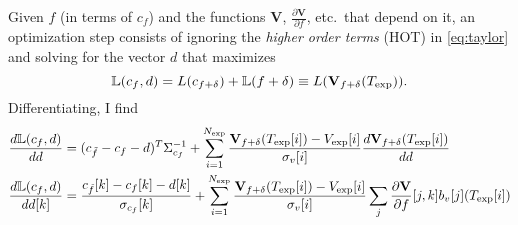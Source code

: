 \documentclass[]{article}
\newcommand{\fnom}{\tilde f}
\newcommand{\partiald}[2]{\frac{\partial #1}{\partial #2}}
\newcommand\Vt{\mathbf{V}}
\newcommand\vexp{V_{\rm{exp}}}
\newcommand\texp{T_{\rm{exp}}}
\newcommand\cf{c_f}
\newcommand\vbasis{b_v}
\newcommand\DVDf{\partiald{\Vt}{f}}
\newcommand\Lbb{\mathbb{L}}
\begin{document}
Given $f$ (in terms of $\cf$) and the functions $\Vt$, $\DVDf$, etc.\
that depend on it, an optimization step consists of ignoring the
\emph{higher order terms} (HOT) in \eqref{eq:taylor} and solving for
the vector $d$ that maximizes
\begin{equation}
  \label{eq:L}
  \Lbb(\cf,d) = L(c_{f+\delta}) +
  \Lbb(f+\delta) \equiv L(\Vt_{f+\delta}(\texp)).
\end{equation}
Differentiating, I find
\begin{align*}
  \frac{d \Lbb(\cf,d)}{d d} &= (c_{\fnom} - \cf - d)^T
  \Sigma^{-1}_{\cf} + \sum_{i=1}^{N_{\rm exp}}
  \frac{\Vt_{f+\delta}(\texp[i]) - \vexp[i] }{\sigma_v[i]}
  \frac{d \Vt_{f+\delta}(\texp[i])}{d d} \\
  \frac{d \Lbb(\cf,d)}{d d[k]} &= 
  \frac{c_{\fnom}[k] - \cf[k] - d[k]}{\sigma_{\cf}[k]} +
  \sum_{i=1}^{N_{\rm exp}}
  \frac{\Vt_{f+\delta}(\texp[i]) - \vexp[i] }{\sigma_v[i]}
  \sum_j \DVDf[j,k] \vbasis[j] (\texp[i])
\end{align*}
\end{document}
